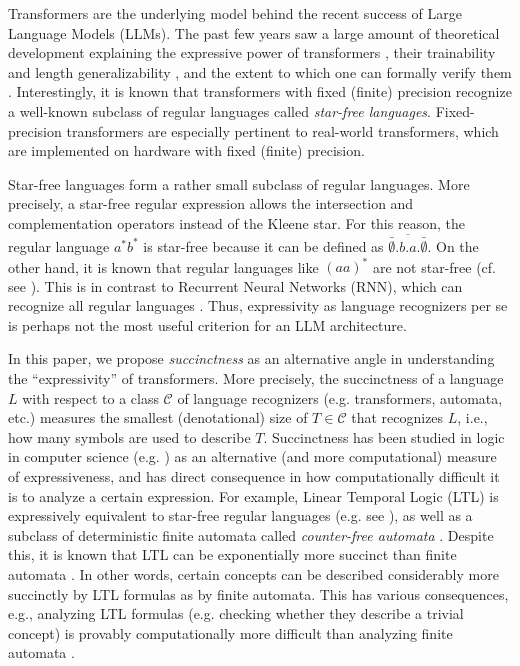 Transformers \citep{Vaswani17} are the underlying model behind the recent 
success of Large Language Models (LLMs). The past few years saw a large amount
of theoretical development explaining the expressive power of transformers
\citep{transformers_survey,barcelo2024logical,YangCA24,hahn20,perez,CC22,tale},
their trainability and length generalizability \citep{raspl,framework,CC22}, 
and the extent to which one can formally verify them \citep{SAL25}. 
Interestingly, it is known that transformers with fixed (finite) precision
\citep{YangCA24,barcelo2024logical,tale,LC25} recognize a well-known subclass of regular languages called
\emph{star-free languages}. Fixed-precision transformers are especially 
pertinent to real-world transformers, which are implemented on hardware with 
fixed (finite) precision.

Star-free languages form a rather small subclass of regular languages. More
precisely, a star-free regular expression allows the intersection and 
complementation operators instead of the Kleene star. For this reason, the 
regular language $a^*b^*$ is star-free because it can be defined as
$\overline{\bar{\emptyset}.b.a.\bar{\emptyset}}$. On the other hand, it is known
that regular languages like $(aa)^*$ are not star-free (cf. see
\citep{straubing-book}). This is in contrast to Recurrent Neural Networks (RNN), which can recognize all 
regular languages \citep{SS95,RNN-hierarchy}. Thus, expressivity as language
recognizers per se is perhaps not the most useful criterion for an LLM 
architecture.

In this paper, we propose \emph{succinctness} as an alternative angle in 
understanding the ``expressivity'' of transformers. More precisely, the
succinctness of a language $L$ with respect to a class $\mathcal{C}$ of 
language recognizers (e.g.  transformers, automata, etc.) measures the smallest 
(denotational) size of $T \in \mathcal{C}$ that recognizes $L$, i.e., how many
symbols are used to describe $T$. Succinctness has been studied in logic in
computer science (e.g. \citep{GS04,Stockmeyer-thesis}) as an alternative (and 
more computational)
measure of expressiveness, and has direct consequence in how computationally
difficult it is to analyze a certain expression. For example, Linear Temporal
Logic (LTL) \citep{pnueli-ltl} is expressively equivalent to star-free regular
languages (e.g. see \citep{libkin-book}), as well as a subclass of deterministic
finite automata called \emph{counter-free automata} \citep{counter-free-book}.
Despite this, it is known that LTL can be exponentially more succinct than
finite automata \citep{SistlaC85}.
In other words, certain concepts can be described considerably more succinctly 
by LTL formulas as by finite automata. This has various consequences, e.g.,
analyzing LTL formulas (e.g. checking whether they describe a trivial concept)
is provably computationally more difficult than analyzing finite automata
\citep{SistlaC85}. 

